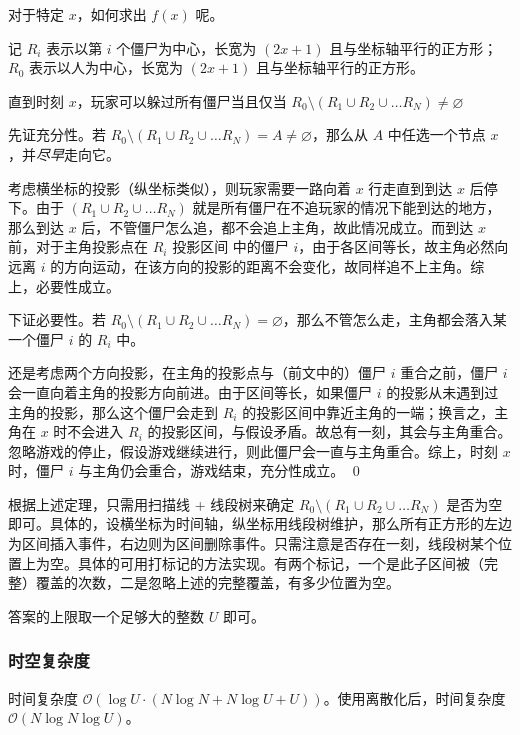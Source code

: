 				对于特定 $x$，如何求出 $f(x)$ 呢。
				
				记 $R_i$ 表示以第 $i$ 个僵尸为中心，长宽为 $(2 x + 1)$ 且与坐标轴平行的正方形； $R_0$ 表示以人为中心，长宽为 $(2 x + 1)$ 且与坐标轴平行的正方形。
				\begin{theorem}
					直到时刻 $x$，玩家可以躲过所有僵尸当且仅当 $R_0 \setminus (R_1 \cup R_2 \cup \ldots R_N) \ne \varnothing$
				\end{theorem}
				\begin{pf}
					先证充分性。若 $R_0 \setminus (R_1 \cup R_2 \cup \ldots R_N) = A \ne \varnothing$，那么从 $A$ 中任选一个节点 $x$，并\emph{尽早}走向它。
					
					考虑横坐标的投影（纵坐标类似），则玩家需要一路向着 $x$ 行走直到到达 $x$ 后停下。由于
$(R_1 \cup R_2 \cup \ldots R_N)$ 就是所有僵尸在不追玩家的情况下能到达的地方，那么到达 $x$ 后，不管僵尸怎么追，都不会追上主角，故此情况成立。而到达 $x$ 前，对于主角投影点在 $R_i$ 投影区间 中的僵尸 $i$，由于各区间等长，故主角必然向远离 $i$ 的方向运动，在该方向的投影的距离不会变化，故同样追不上主角。综上，必要性成立。
					
					下证必要性。若 $R_0 \setminus (R_1 \cup R_2 \cup \ldots R_N) = \varnothing$，那么不管怎么走，主角都会落入某一个僵尸 $i$ 的 $R_i$ 中。
					
					还是考虑两个方向投影，在主角的投影点与（前文中的）僵尸 $i$ 重合之前，僵尸 $i$ 会一直向着主角的投影方向前进。由于区间等长，如果僵尸 $i$ 的投影从未遇到过主角的投影，那么这个僵尸会走到 $R_i$ 的投影区间中靠近主角的一端；换言之，主角在 $x$ 时不会进入 $R_i$ 的投影区间，与假设矛盾。故总有一刻，其会与主角重合。忽略游戏的停止，假设游戏继续进行，则此僵尸会一直与主角重合。综上，时刻 $x$ 时，僵尸 $i$ 与主角仍会重合，游戏结束，充分性成立。 \qed
				\end{pf}
				根据上述定理，只需用扫描线 + 线段树来确定 $R_0 \setminus (R_1 \cup R_2 \cup \ldots R_N)$ 是否为空即可。具体的，设横坐标为时间轴，纵坐标用线段树维护，那么所有正方形的左边为区间插入事件，右边则为区间删除事件。只需注意是否存在一刻，线段树某个位置上为空。具体的可用打标记的方法实现。有两个标记，一个是此子区间被（完整）覆盖的次数，二是忽略上述的完整覆盖，有多少位置为空。
				
				答案的上限取一个足够大的整数 $U$ 即可。
			\subsubsection{时空复杂度}
				时间复杂度 $\mathcal{O}\left(\log U \cdot(N \log N + N \log U + U)\right)$。使用离散化后，时间复杂度 $\mathcal{O}\left(N \log N\log U\right)$。
					
